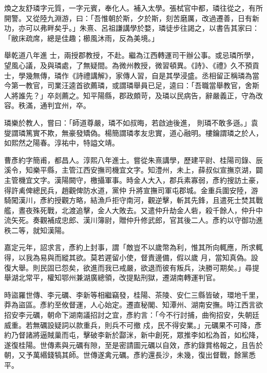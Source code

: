 \begin{pinyinscope}
 煥之友舒璘字元質，一字元賓，奉化人。補入太學。張栻官中都，璘往從之，有所開警。又從陸九淵游，曰：「吾惟朝於斯，夕於斯，刻苦磨厲，改過遷善，日有新功，亦可以弗畔矣乎。」朱熹、呂祖謙講學於婺，璘徒步往謁之，以書告其家曰：「敝床疏席，總是佳趣；櫛風沐雨，反為美境。」



 舉乾道八年進
 士，兩授郡教授，不赴。繼為江西轉運司干辦公事。或忌璘所學，望風心議，及與璘處，了無疑間。為微州教授，微習頓異。《詩》、《禮》久不預貢士，學幾無傳，璘作《詩禮講解》，家傳人習，自是其學浸盛。丞相留正稱璘為當今第一教官，司業汪逵首欲薦璘，或謂璘舉員已足，逵曰：「吾職當舉教官，舍斯人將誰先？」卒剡薦之。知平陽縣，郡政頗苛，及璘以民病告，辭嚴義正，守為改容。秩滿，通判宜州，卒。



 璘樂於教人，嘗曰：「師道尊嚴，璘不如叔晦，若啟迪後進，
 則璘不敢多遜。」袁燮謂璘篤實不欺，無豪發矯偽。楊簡謂璘孝友忠實，道心融明。樓鑰謂璘之於人，如熙然之陽春。淳祐中，特謚文靖。



 曹彥約字簡甫，都昌人。淳熙八年進士。嘗從朱熹講學，歷建平尉、桂陽司錄、辰溪令，知樂平縣，主管江西安撫司機宜文字。知澧州，未上，薛叔似宣撫京湖，闢主管機宜文字。漢陽闕守，檄攝軍事。時金人大入，郡兵素寡弱，彥約搜訪土豪，得許禼俾總民兵，趙觀俾防水道，黨仲
 升將宣撫司軍屯郡城。金重兵圍安陸，游騎闖漢川，彥約授觀方略，結漁戶拒守南河，觀逆擊，斬其先鋒，且遣死士焚其戰艦，晝夜殊死戰，北渡追擊，金人大敗去。又遣仲升劫金人砦，殺千餘人，仲升中流矢死。奏觀補成忠郎、漢川簿尉，贈仲升修武郎，官其後二人。彥約以守御功進秩二等，就知漢陽。



 嘉定元年，詔求言，彥約上封事，謂「敵豈不以歲幣為利，惟其所向輒應，所求輒得，以我為易與而縱其欲。莫若遲留小使，督責邊備，假以歲
 月，當知真偽。設復大舉。則民固已怨矣，欲進而我已戒嚴，欲退而彼有叛兵，決勝可期矣。」尋提舉湖北常平，權知鄂州兼湖廣總領，改提點刑獄，遷湖南轉運判官。



 時盜羅世傳、李元礪、李新等相繼竊發，桂陽、茶陵、安仁三縣皆破，環地千里，莽為盜區。彥約至攸督運，人心始定。遷直秘閣、知潭州、湖南安撫。時江西言欲招安李元礪，朝命下湖南議招討之宜，彥約言：「今不行討捕，曲徇招安，失朝廷威重。若無礪設疑詞以款重兵，則兵不可撤
 戍，民不得安業。」元礪果不可降，彥約乃督諸將逼賊巢而屯，擊破李新於酃洣，新中創死，眾推李如松為首，如松降，遂復桂陽。世傳素與元礪有隙，至是密請圖元礪以自效，彥約錄賞格報之，且告於朝，又予萬緡錢犒其師。世傳遂禽元礪。彥約還長沙，未幾，復出督戰，餘黨悉平。




\end{pinyinscope}
